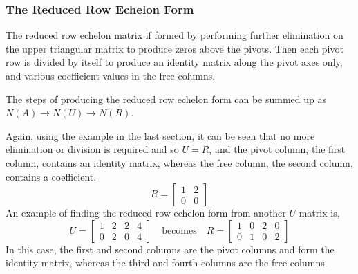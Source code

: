         \subsubsection{The Reduced Row Echelon Form}
            The reduced row echelon matrix if formed by performing further elimination on the upper triangular matrix 
            to produce zeros above the pivots. Then each pivot row is divided by itself to produce an identity matrix 
            along the pivot axes only, and various coefficient values in the free columns.

            \par \hfill \break
            The steps of producing the reduced row echelon form can be summed up as \(N(A) \rightarrow N(U) 
            \rightarrow N(R)\).

            \par \hfill \break
            Again, using the example in the last section, it can be seen that no more elimination or division is
            required and so \(U=R\), and the pivot column, the first column, contains an identity matrix, whereas the 
            free column, the second column, contains a coefficient.
            \begin{equation}
                R = 
                \begin{bmatrix}
                    1 & 2 \\
                    0 & 0
                \end{bmatrix}
            \end{equation}
            An example of finding the reduced row echelon form from another \(U\) matrix is,
            \begin{equation}
                U = 
                \begin{bmatrix}
                    1 & 2 & 2 & 4 \\
                    0 & 2 & 0 & 4
                \end{bmatrix}
                \quad \textrm{becomes} \quad
                R = 
                \begin{bmatrix}
                    1 & 0 & 2 & 0 \\
                    0 & 1 & 0 & 2
                \end{bmatrix}
            \end{equation}
            In this case, the first and second columns are the pivot columns and form the identity matrix, whereas the 
            third and fourth columns are the free columns.

